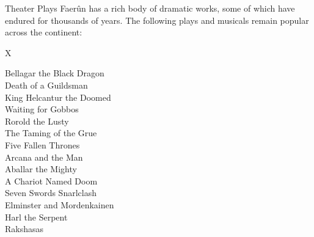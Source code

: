 \documentclass[10pt,a4paper,twoside,twocolumn,openany,bg=print,nodeprecatedcode]{dndbook}
\begin{document}
\begin{DndComment}{Theater Plays}
Faerûn has a rich body of dramatic works, some of which have endured for thousands of years. The following plays and musicals remain popular across the continent:

\begin{DndTable}{X}

Bellagar the Black Dragon\\
Death of a Guildsman\\
King Helcantur the Doomed\\
Waiting for Gobbos\\
Rorold the Lusty\\
The Taming of the Grue\\
Five Fallen Thrones\\
Arcana and the Man\\
Aballar the Mighty\\
A Chariot Named Doom\\
Seven Swords Snarlclash\\
Elminster and Mordenkainen\\
Harl the Serpent\\
Rakshasas\\
\end{DndTable}


\end{DndComment}
\end{document}
